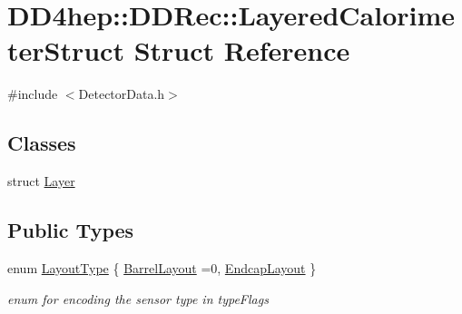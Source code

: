 \hypertarget{struct_d_d4hep_1_1_d_d_rec_1_1_layered_calorimeter_struct}{}\section{D\+D4hep\+:\+:D\+D\+Rec\+:\+:Layered\+Calorimeter\+Struct Struct Reference}
\label{struct_d_d4hep_1_1_d_d_rec_1_1_layered_calorimeter_struct}


{\ttfamily \#include $<$Detector\+Data.\+h$>$}

\subsection*{Classes}
\begin{DoxyCompactItemize}
\item 
struct \hyperlink{struct_d_d4hep_1_1_d_d_rec_1_1_layered_calorimeter_struct_1_1_layer}{Layer}
\end{DoxyCompactItemize}
\subsection*{Public Types}
\begin{DoxyCompactItemize}
\item 
enum \hyperlink{struct_d_d4hep_1_1_d_d_rec_1_1_layered_calorimeter_struct_a560e60d5a6a1671ab8b21629714b4d36}{Layout\+Type} \{ \hyperlink{struct_d_d4hep_1_1_d_d_rec_1_1_layered_calorimeter_struct_a560e60d5a6a1671ab8b21629714b4d36a3fea4df83caa5f87e268860c1a31bd35}{Barrel\+Layout} =0, 
\hyperlink{struct_d_d4hep_1_1_d_d_rec_1_1_layered_calorimeter_struct_a560e60d5a6a1671ab8b21629714b4d36a24acc3ffef033863537a6df507ffad72}{Endcap\+Layout}
 \}\begin{DoxyCompactList}\small\item\em enum for encoding the sensor type in type\+Flags \end{DoxyCompactList}
\end{DoxyCompactItemize}
